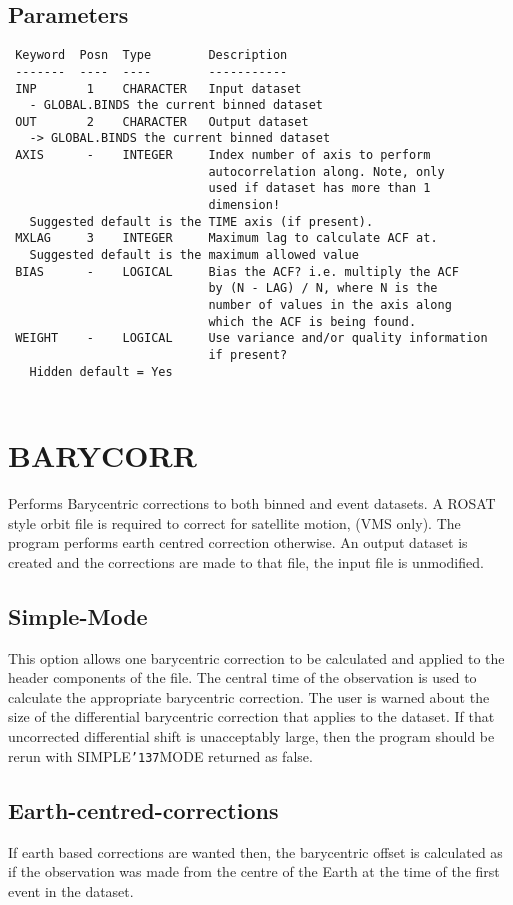 \documentclass{book}
\renewcommand{\_}{{\tt\char'137}}     %
\begin{document}
\subsection{Parameters}
\begin{verbatim}
 Keyword  Posn  Type        Description
 -------  ----  ----        -----------
 INP       1    CHARACTER   Input dataset
   - GLOBAL.BINDS the current binned dataset
 OUT       2    CHARACTER   Output dataset
   -> GLOBAL.BINDS the current binned dataset
 AXIS      -    INTEGER     Index number of axis to perform
                            autocorrelation along. Note, only
                            used if dataset has more than 1
                            dimension!
   Suggested default is the TIME axis (if present).
 MXLAG     3    INTEGER     Maximum lag to calculate ACF at.
   Suggested default is the maximum allowed value
 BIAS      -    LOGICAL     Bias the ACF? i.e. multiply the ACF
                            by (N - LAG) / N, where N is the
                            number of values in the axis along
                            which the ACF is being found.
 WEIGHT    -    LOGICAL     Use variance and/or quality information
                            if present?
   Hidden default = Yes
 
\end{verbatim}\section{BARYCORR}
Performs Barycentric corrections to both binned and event datasets.
A ROSAT style orbit file is required to correct for satellite motion,
(VMS only). The program performs earth centred correction otherwise.
An output dataset is created and the corrections are made to that file,
the input file is unmodified.
 
\subsection{Simple-Mode}
This option allows one barycentric correction to be calculated and
applied to the header components of the file. The central time of the
observation is used to calculate the appropriate barycentric correction.
The user is warned about the size of the differential barycentric
correction that applies to the dataset. If that uncorrected differential
shift is unacceptably large, then the program should be rerun with
SIMPLE\_MODE returned as false.
 
\subsection{Earth-centred-corrections}
If earth based corrections are wanted then, the barycentric offset is
calculated as if the observation was made from the centre of the Earth
at the time of the first event in the dataset.
 
\end{document}
